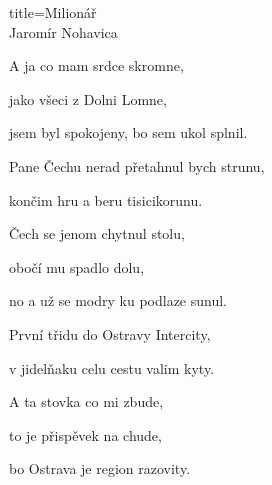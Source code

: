 \begin{song}{title=\predtitle\centering Milionář \\\large Jaromír Nohavica  \vspace*{-0.3cm}}
\begin{centerjustified}
\begin{varwidth}[t]{0.5\textwidth}
A ja co mam srdce skromne,

jako všeci z Dolni Lomne,

jsem byl spokojeny, bo sem ukol splnil.

\sloka
Pane Čechu nerad přetahnul bych strunu,

končim hru a beru tisicikorunu.

Čech se jenom chytnul stolu,

obočí mu spadlo dolu,

no a už se modry ku podlaze sunul.

\sloka
První třidu do Ostravy Intercity,

v jidelňaku celu cestu valim kyty.

A ta stovka co mi zbude,

to je přispěvek na chude,

bo Ostrava je region razovity.


\end{varwidth}
\end{centerjustified}
\setcounter{Slokočet}{0}
\end{song}
